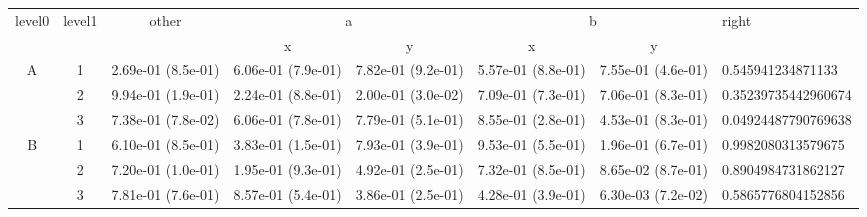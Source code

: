 \begin{tabular}{cccccccl}
\toprule
\multirow{2}{*}{level0} & \multirow{2}{*}{level1}& \multirow{2}{*}{other}&\multicolumn{2}{c}{a}&\multicolumn{2}{c}{b}& \multirow{2}{*}{right}\tabularnewline
\cmidrule(lr){4-5}
\cmidrule(lr){6-7}
&&&x&y&x&y\tabularnewline
\midrule
\multirow{3}{*}{A}&1& 2.69e-01 (8.5e-01)& 6.06e-01 (7.9e-01)& 7.82e-01 (9.2e-01)& 5.57e-01 (8.8e-01)& 7.55e-01 (4.6e-01)& 0.545941234871133\tabularnewline
&2& 9.94e-01 (1.9e-01)& 2.24e-01 (8.8e-01)& 2.00e-01 (3.0e-02)& 7.09e-01 (7.3e-01)& 7.06e-01 (8.3e-01)& 0.35239735442960674\tabularnewline
&3& 7.38e-01 (7.8e-02)& 6.06e-01 (7.8e-01)& 7.79e-01 (5.1e-01)& 8.55e-01 (2.8e-01)& 4.53e-01 (8.3e-01)& 0.04924487790769638\tabularnewline
\midrule
\multirow{3}{*}{B}&1& 6.10e-01 (8.5e-01)& 3.83e-01 (1.5e-01)& 7.93e-01 (3.9e-01)& 9.53e-01 (5.5e-01)& 1.96e-01 (6.7e-01)& 0.9982080313579675\tabularnewline
&2& 7.20e-01 (1.0e-01)& 1.95e-01 (9.3e-01)& 4.92e-01 (2.5e-01)& 7.32e-01 (8.5e-01)& 8.65e-02 (8.7e-01)& 0.8904984731862127\tabularnewline
&3& 7.81e-01 (7.6e-01)& 8.57e-01 (5.4e-01)& 3.86e-01 (2.5e-01)& 4.28e-01 (3.9e-01)& 6.30e-03 (7.2e-02)& 0.5865776804152856\tabularnewline
\bottomrule
\end{tabular}
